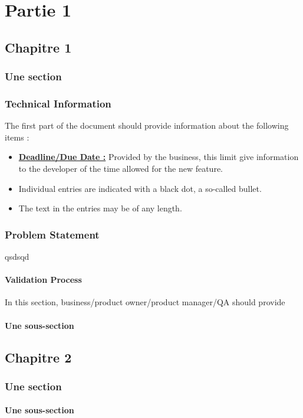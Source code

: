\documentclass{book}
\begin{document}
\tableofcontents
\part{Partie 1}
    \chapter{Chapitre 1}
        \section*{Une section}
        \section{Technical Information}
        The first part of the document should provide information about the following items :
        \begin{itemize}
  			\item \textbf{\underline{Deadline/Due Date :}} Provided by the business, this limit give information to the developer of the time allowed for the new feature.
  			\item Individual entries are indicated with a black dot, a so-called bullet.
  			\item The text in the entries may be of any length.
		\end{itemize}
        \section{Problem Statement}
            qsdsqd
        \subsection{Validation Process}
        In this section, business/product owner/product manager/QA should provide 
        \subsection{Une sous-section}
    \chapter{Chapitre 2}
        \section{Une section}
            \subsection{Une sous-section}
\end{document}
